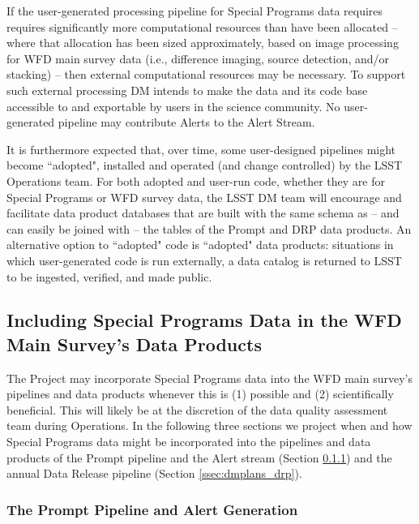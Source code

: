 \documentclass[DM,lsstdoc,toc]{lsstdoc}
\begin{document}
If the user-generated processing pipeline for Special Programs data requires requires significantly more computational resources than have been allocated -- where that allocation has been sized approximately, based on image processing for WFD main survey data (i.e., difference imaging, source detection, and/or stacking) -- then external computational resources may be necessary.
To support such external processing DM intends to make the data and its code base accessible to and exportable by users in the science community.
No user-generated pipeline may contribute Alerts to the Alert Stream. %

It is furthermore expected that, over time, some user-designed pipelines might become ``adopted", installed and operated (and change controlled) by the LSST Operations team.
For both adopted and user-run code, whether they are for Special Programs or WFD survey data, the LSST DM team will encourage and facilitate data product databases that are built with the same schema as -- and can easily be joined with -- the tables of the Prompt and DRP data products.
An alternative option to ``adopted" code is ``adopted" data products: situations in which user-generated code is run externally, a data catalog is returned to LSST to be ingested, verified, and made public.



\subsection{Including Special Programs Data in the WFD Main Survey's Data Products}\label{ssec:dmplans_WFD}

The Project may incorporate Special Programs data into the WFD main survey's pipelines and data products whenever this is (1) possible and (2) scientifically beneficial. This will likely be at the discretion of the data quality assessment team during Operations. In the following three sections we project when and how Special Programs data might be incorporated into the pipelines and data products of the Prompt pipeline and the Alert stream (Section \ref{ssec:dmplans_prompt}) and the annual Data Release pipeline (Section \ref{ssec:dmplans_drp}).

\subsubsection{The Prompt Pipeline and Alert Generation}\label{ssec:dmplans_prompt}
\end{document}
